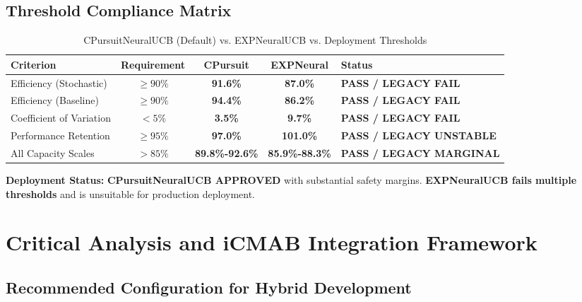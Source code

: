 \documentclass[12pt,a4paper]{article}
\newcommand{\success}[1]{\textcolor{accentgreen}{\textbf{#1}}}
\newcommand{\legacy}[1]{\textcolor{legacycolor}{\textbf{#1}}}
\begin{document}
\subsection{Threshold Compliance Matrix}

\begin{table}[H]
\centering
\caption{CPursuitNeuralUCB (Default) vs. EXPNeuralUCB vs. Deployment Thresholds}
\begin{tabular}{@{}lcccl@{}}
\toprule
\textbf{Criterion} & \textbf{Requirement} & \textbf{CPursuit} & \textbf{EXPNeural} & \textbf{Status} \\
\midrule
Efficiency (Stochastic) & $\geq 90\%$ & \success{91.6\%} & \legacy{87.0\%} & \success{\checkmark PASS / LEGACY FAIL} \\
Efficiency (Baseline) & $\geq 90\%$ & \success{94.4\%} & \legacy{86.2\%} & \success{\checkmark PASS / LEGACY FAIL} \\
Coefficient of Variation & $< 5\%$ & \success{3.5\%} & \legacy{9.7\%} & \success{\checkmark PASS / LEGACY FAIL} \\
Performance Retention & $\geq 95\%$ & \success{97.0\%} & \legacy{101.0\%} & \success{\checkmark PASS / LEGACY UNSTABLE} \\
All Capacity Scales & $> 85\%$ & \success{89.8\%-92.6\%} & \legacy{85.9\%-88.3\%} & \success{\checkmark PASS / LEGACY MARGINAL} \\
\bottomrule
\end{tabular}
\end{table}

\textbf{Deployment Status:} \success{\textbf{CPursuitNeuralUCB APPROVED}} with substantial safety margins. \legacy{\textbf{EXPNeuralUCB fails multiple thresholds}} and is unsuitable for production deployment.

\section{Critical Analysis and iCMAB Integration Framework}

\subsection{Recommended Configuration for Hybrid Development}
\end{document}
